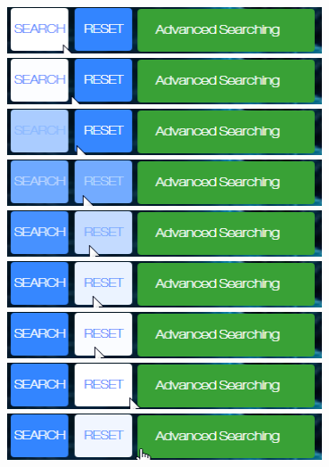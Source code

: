 \documentclass[10pt,twoside,a4paper,titlepage]{article}
\begin{document}
 	\newline
	\includegraphics[width=0.7\textwidth]{cyf/reset1.png}
	\newline
	\includegraphics[width=0.7\textwidth]{cyf/reset2.png}
	\newline
	\includegraphics[width=0.7\textwidth]{cyf/reset3.png}
	\newline	
	\includegraphics[width=0.7\textwidth]{cyf/reset4.png}
	\newline	
	\includegraphics[width=0.7\textwidth]{cyf/reset5.png}
	\newline	
	\includegraphics[width=0.7\textwidth]{cyf/reset6.png}
	\newline	
	\includegraphics[width=0.7\textwidth]{cyf/reset7.png}
	\newline
	\includegraphics[width=0.7\textwidth]{cyf/Advanced_searching1.png}
	\newline
	\includegraphics[width=0.7\textwidth]{cyf/Advanced_searching2.png}
\end{document}
